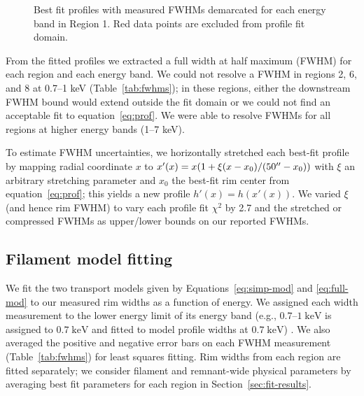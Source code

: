 \documentclass[iop, apj, numberedappendix, twocolappendix]{emulateapj}
\newcommand*{\mt}{\mathrm}
\newcommand*{\unit}[1]{\;\mt{#1}}  %
\begin{document}
\begin{figure*}[ht]
    \caption{Best fit profiles with measured FWHMs demarcated for each energy
             band in Region 1.  Red data points are excluded from profile fit
             domain.}
    \label{fig:profiles}
\end{figure*}

From the fitted profiles we extracted a full width at half maximum (FWHM) for
each region and each energy band.  We could not resolve a FWHM in regions 2, 6,
and 8 at 0.7--1 keV (Table~\ref{tab:fwhms}); in these regions, either
the downstream FWHM bound would extend outside the fit domain or we could not
find an acceptable fit to equation~\eqref{eq:prof}.  We were able to resolve
FWHMs for all regions at higher energy bands (1--7 keV).

To estimate FWHM uncertainties, we horizontally stretched each best-fit
profile by mapping radial coordinate $x$ to
$x'(x) = x (1 + \xi (x-x_0)/(50\mbox{$^{\prime\prime}$}-x_0))$ with $\xi$ an arbitrary stretching
parameter and $x_0$ the best-fit rim center from equation~\eqref{eq:prof};
this yields a new profile $h'(x) = h(x'(x))$.
We varied $\xi$ (and hence rim FWHM) to vary each profile fit $\chi^2$ by 2.7
and the stretched or compressed FWHMs as upper/lower bounds on our reported
FWHMs. 


\subsection{Filament model fitting}
\label{sec:fits}

We fit the two transport models given by Equations~\eqref{eq:simp-mod} and
\eqref{eq:full-mod} to our measured rim widths as a function of energy.
We assigned each width measurement to the lower energy limit of its energy band
(e.g., $0.7$--$1 \unit{keV}$ is assigned to $0.7 \unit{keV}$ and fitted to
model profile widths at $0.7 \unit{keV}$) .
We also averaged the positive and negative error bars on each FWHM measurement
(Table~\ref{tab:fwhms}) for least squares fitting.
Rim widths from each region are fitted separately; we consider filament and
remnant-wide physical parameters by averaging best fit parameters for each
region in Section~\ref{sec:fit-results}.
\end{document}

